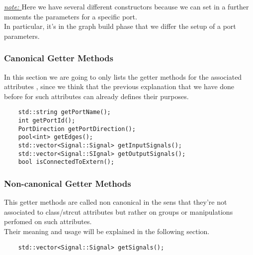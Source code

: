 \documentclass{article}
\begin{document}
\textit{\underline{note: }} Here we have several different constructors because we can set in a further moments the parameters for a specific port.\\
In particular, it's in the graph build phase that we differ the setup of a port parameters.\\


\subsubsection{Canonical Getter Methods}

In this section we are going to only lists the getter methods for the associated attributes , since we think that 
the previous explanation that we have done before for such attributes can already defines their purposes.\\

\begin{mdframed}[hidealllines=true, backgroundcolor=magenta!10]
	\begin{lstlisting}
	std::string getPortName();
	int getPortId();
	PortDirection getPortDirection();
	pool<int> getEdges();
	std::vector<Signal::Signal> getInputSignals();
	std::vector<Signal::SIgnal> getOutputSignals();
	bool isConnectedToExtern();
	\end{lstlisting}
\end{mdframed}

\subsubsection{Non-canonical Getter Methods}

This getter methods are called non canonical in the sens that they're not associated to class/strcut attributes but rather on groups or manipulations perfomed on such attributes.\\
Their meaning and usage will be explained in the following section.\\

\begin{mdframed}[hidealllines=true, backgroundcolor=magenta!10]
	\begin{lstlisting}
	std::vector<Signal::Signal> getSignals();
	\end{lstlisting}
\end{mdframed}
\end{document}
